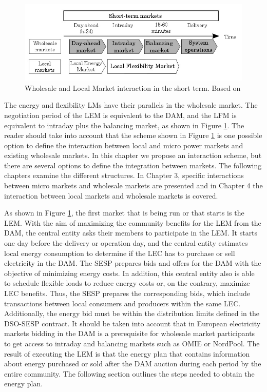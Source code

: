 \begin{figure}[]
	\centering
	\includegraphics[width=0.9\columnwidth ]{ChapterIntro/Figures/LM_WSM_Interaction.jpg}
		\caption{Wholesale and Local Market interaction in the short term. Based on \cite{InternationalEnergyAgency2016}}
	\label{fig:212}  
\end{figure}


The energy and flexibility LMs have their parallels in the wholesale market. The negotiation period of the LEM is equivalent to the DAM, and the LFM is equivalent to intraday plus the balancing market, as shown in Figure \ref{fig:212}. The reader should take into account that the scheme shown in Figure \ref{fig:212} is one possible option to define the interaction between local and micro power markets and existing wholesale markets. In this chapter we propose an interaction scheme, but there are several options to define the integration between markets. The following chapters examine the different structures. In Chapter 3, specific interactions between micro markets
and wholesale markets are presented and in Chapter 4 the interaction between local markets and wholesale
markets is covered.

As shown in Figure \ref{fig:212}, the first market that is being run or that starts is the LEM. With the aim of maximizing the community benefits for the LEM from the DAM, the central entity asks their members to participate in the LEM. It starts one day before the delivery or operation day, and the central entity estimates local energy consumption to determine if the LEC has to purchase or sell electricity in the DAM. The SESP prepares bids and offers for the DAM with the objective of minimizing energy costs. In addition, this central entity also is able to schedule flexible loads to reduce energy costs or, on the contrary, maximize LEC benefits.
Thus, the SESP prepares the corresponding bids, which include transactions between local consumers and producers within the same LEC.
Additionally, the energy bid must be within the distribution limits defined in the DSO-SESP contract. It should be taken into account that in European electricity markets bidding in the DAM is a prerequisite for wholesale market participants to get access to intraday and balancing markets such as OMIE or NordPool. The result of executing the LEM is that the energy plan that contains information about energy purchased or sold after the DAM auction during each period by the entire community. The following section outlines the steps needed to obtain the energy plan.

